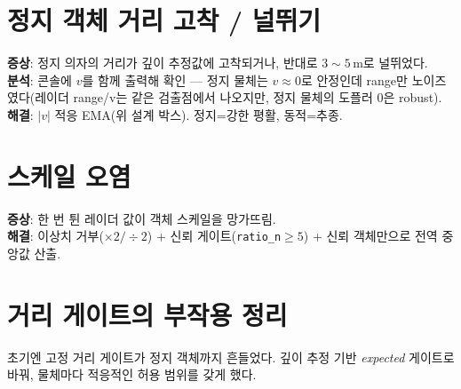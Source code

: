 \section{정지 객체 거리 고착 / 널뛰기}
\textbf{증상}: 정지 의자의 거리가 깊이 추정값에 고착되거나, 반대로 $3\sim5$\,m로
널뛰었다.\\
\textbf{분석}: 콘솔에 $v$를 함께 출력해 확인 — 정지 물체는 $v\approx0$로 안정인데
range만 노이즈였다(레이더 range/v는 같은 검출점에서 나오지만, 정지 물체의
도플러 0은 robust).\\
\textbf{해결}: $|v|$ 적응 EMA(위 설계 박스). 정지=강한 평활, 동적=추종.

\section{스케일 오염}
\textbf{증상}: 한 번 튄 레이더 값이 객체 스케일을 망가뜨림.\\
\textbf{해결}: 이상치 거부($\times2/\div2$) + 신뢰 게이트(\texttt{ratio\_n}$\ge5$) +
신뢰 객체만으로 전역 중앙값 산출.

\section{거리 게이트의 부작용 정리}
초기엔 고정 거리 게이트가 정지 객체까지 흔들었다. 깊이 추정 기반
\emph{expected} 게이트로 바꿔, 물체마다 적응적인 허용 범위를 갖게 했다.
